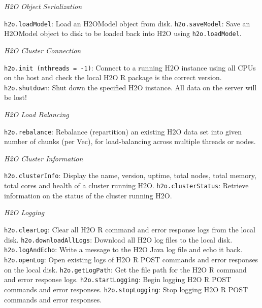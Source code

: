 {{{\emph{H2O Object Serialization}\par
{\texttt{h2o.loadModel}}: Load an H2OModel object from disk.\newline
{\texttt{h2o.saveModel}}: Save an H2OModel object to disk to be loaded back into H2O using {\texttt{h2o.loadModel}}.\newline

\emph{H2O Cluster Connection}\par
{\texttt{h2o.init (nthreads = -1)}}: Connect to a running H2O instance using all CPUs on the host and check the local H2O R package is the correct version.\newline
{\texttt{h2o.shutdown}}: Shut down the specified H2O instance. All data on the server will be lost!\newline

\emph{H2O Load Balancing}\par
{\texttt{h2o.rebalance}}: Rebalance (repartition) an existing H2O data set into given number of chunks (per Vec), for load-balancing across multiple threads or nodes.\newline %

\emph{H2O Cluster Information}\par
{\texttt{h2o.clusterInfo}}: Display the name, version, uptime, total nodes, total memory, total cores and health of a cluster running H2O.\newline
{\texttt{h2o.clusterStatus}}: Retrieve information on the status of the cluster running H2O.\newline

\emph{H2O Logging}\par
{\texttt{h2o.clearLog}}: Clear all H2O R command and error response logs from the local disk. \newline
{\texttt{h2o.downloadAllLogs}}: Download all H2O log files to the local disk.\newline
{\texttt{h2o.logAndEcho}}: Write a message to the H2O Java log file and echo it back.  \newline
{\texttt{h2o.openLog}}: Open existing logs of H2O R POST commands and error responses on the local disk.\newline
{\texttt{h2o.getLogPath}}: Get the file path for the H2O R command and error response logs.\newline
{\texttt{h2o.startLogging}}: Begin logging H2O R POST commands and error responses. \newline
{\texttt{h2o.stopLogging}}: Stop logging H2O R POST commands and error responses.\newline

}}}
